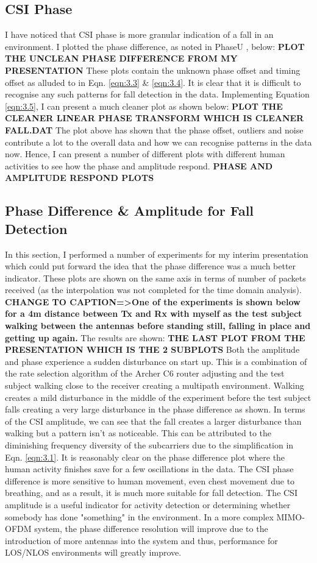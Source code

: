 \subsection{CSI Phase}
I have noticed that CSI phase is more granular indication of a fall in an environment. I plotted the phase difference, as noted in PhaseU \citep{PhaseU}, below:
\textbf{PLOT THE UNCLEAN PHASE DIFFERENCE FROM MY PRESENTATION }
These plots contain the unknown phase offset and timing offset as alluded to in Eqn. \ref{eqn:3.3} \& \ref{eqn:3.4}. It is clear that it is difficult to recognise any such patterns for fall detection in the data. Implementing Equation \ref{eqn:3.5}, I can present a much cleaner plot as shown below:
\textbf{PLOT THE CLEANER LINEAR PHASE TRANSFORM WHICH IS CLEANER FALL.DAT}
The plot above has shown that the phase offset, outliers and noise contribute a lot to the overall data and how we can recognise patterns in the data now. Hence, I can present a number of different plots with different human activities to see how the phase and amplitude respond. 
\textbf{PHASE AND AMPLITUDE RESPOND PLOTS}
\subsection{Phase Difference \& Amplitude for Fall Detection}
In this section, I performed a number of experiments for my interim presentation which could put forward the idea that the phase difference was a much better indicator. These plots are shown on the same axis in terms of number of packets received (as the interpolation was not completed for the time domain analysis). 
\textbf{CHANGE TO CAPTION=>One of the experiments is shown below for a 4m distance between Tx and Rx with myself as the test subject walking between the antennas before standing still, falling in place and getting up again.} The results are shown:
\textbf{THE LAST PLOT FROM THE PRESENTATION WHICH IS THE 2 SUBPLOTS}
Both the amplitude and phase experience a sudden disturbance on start up. This is a combination of the rate selection algorithm of the Archer C6 router adjusting and the test subject walking close to the receiver creating a multipath environment. Walking creates a mild disturbance in the middle of the experiment before the test subject falls creating a very large disturbance in the phase difference as shown. In terms of the CSI amplitude, we can see that the fall creates a larger disturbance than walking but a pattern isn't as noticeable. This can be attributed to the diminishing frequency diversity of the subcarriers due to the simplification in Eqn. \ref{eqn:3.1}. It is reasonably clear on the phase difference plot where the human activity finishes save for a few oscillations in the data. The CSI phase difference is more sensitive to human movement, even chest movement due to breathing, and as a result, it is much more suitable for fall detection. The CSI amplitude is a useful indicator for activity detection or determining whether somebody has done "something" in the environment. In a more complex MIMO-OFDM system, the phase difference resolution will improve due to the introduction of more antennas into the system and thus, performance for LOS/NLOS environments will greatly improve.